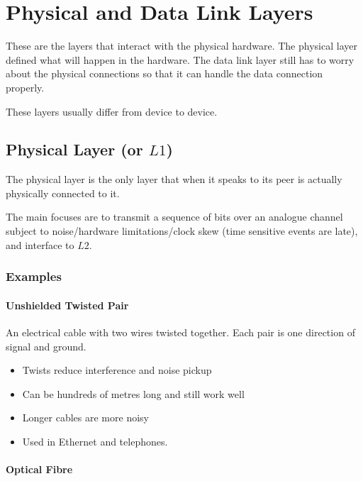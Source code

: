\section{Physical and Data Link Layers}\label{sec:physical_and_data_link_layers}

These are the layers that interact with the physical hardware.
The physical layer defined what will happen in the hardware.
The data link layer still has to worry about the physical connections so that it can handle the data connection properly.

\begin{note}
	These layers usually differ from device to device.
\end{note}

\subsection{Physical Layer (or \(L1\))}\label{sub:physical_layer_or_mkl1_}

The physical layer is the only layer that when it speaks to its peer is actually physically connected to it.

The main focuses are to transmit a sequence of bits over an analogue channel subject to noise/hardware limitations/clock skew (time sensitive events are late), and interface to \(L2\).

\subsubsection{Examples}\label{ssub:examples}

\paragraph{Unshielded Twisted Pair}\label{par:unshielded_twisted_pair}

An electrical cable with two wires twisted together.
Each pair is one direction of signal and ground.
\begin{itemize}
	\item Twists reduce interference and noise pickup
	\item Can be hundreds of metres long and still work well
	\item Longer cables are more noisy
	\item Used in Ethernet and telephones.
\end{itemize}

\paragraph{Optical Fibre}\label{par:optical_fibre}

